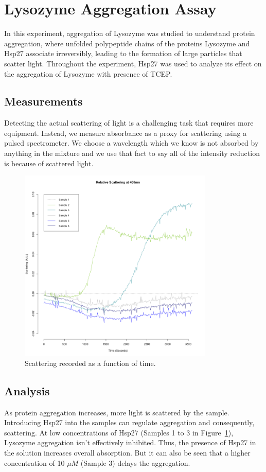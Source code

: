\documentclass[a4paper,11pt]{article}
\begin{document}
    \section{Lysozyme Aggregation Assay}
        In this experiment, aggregation of Lysozyme was studied to understand protein aggregation, 
        where unfolded polypeptide chains of the proteins Lysozyme and Hsp27 associate irreversibly, 
        leading to the formation of large particles that scatter light. 
        Throughout the experiment, Hsp27 was used to analyze its effect on the aggregation of 
        Lysozyme with presence of TCEP.
        
        \subsection*{Measurements}
            Detecting the actual scattering of light is a challenging task that requires more equipment.
            Instead, we measure absorbance as a proxy for scattering using a pulsed spectrometer.
            We choose a wavelength which we know is not absorbed by anything in the mixture and 
            we use that fact to say all of the intensity reduction is because of scattered light.
            \begin{figure}[H]
                \centering
                \includegraphics[width=350px]{../resources/aggregation_main.png}
                \caption{Scattering recorded as a function of time.}\label{fig:agg_main}
            \end{figure}

        \subsection*{Analysis}
            As protein aggregation increases, more light is scattered by the sample. 
            Introducing Hsp27 into the samples can regulate aggregation and consequently, 
            scattering. At low concentrations of Hsp27 (Samples 1 to 3 in Figure~\ref{fig:agg_main}), 
            Lysozyme aggregation isn't effectively inhibited. 
            Thus, the presence of Hsp27 in the solution increases overall absorption. 
            But it can also be seen that a higher concentration of 10 $\mu M$ (Sample 3) delays the aggregation. 
            
\end{document}
